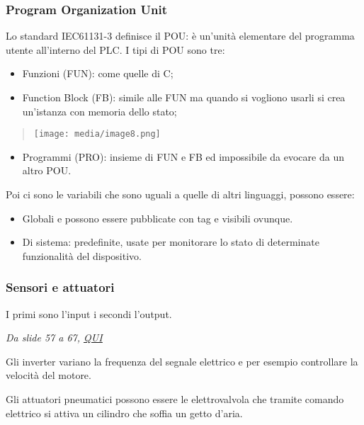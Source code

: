 \subsubsection{Program Organization
Unit}\label{program-organization-unit}

Lo standard IEC61131-3 definisce il POU: è un'unità elementare del
programma utente all'interno del PLC. I tipi di POU sono tre:

\begin{itemize}
\item
  Funzioni (FUN): come quelle di C;
\item
  Function Block (FB): simile alle FUN ma quando si vogliono usarli si
  crea un'istanza con memoria dello stato;
\end{itemize}

\begin{quote}
\texttt{[image: media/image8.png]}
\end{quote}

\begin{itemize}
\item
  Programmi (PRO): insieme di FUN e FB ed impossibile da evocare da un
  altro POU.
\end{itemize}

Poi ci sono le variabili che sono uguali a quelle di altri linguaggi,
possono essere:

\begin{itemize}
\item
  Globali e possono essere pubblicate con tag e visibili ovunque.
\item
  Di sistema: predefinite, usate per monitorare lo stato di determinate
  funzionalità del dispositivo.
\end{itemize}

\subsubsection{Sensori e attuatori}\label{sensori-e-attuatori}

I primi sono l'input i secondi l'output.

\emph{Da slide 57 a 67,
\href{https://virtuale.unibo.it/pluginfile.php/2061612/mod_resource/content/0/LabSisReti\%20-\%20Modulo\%20I\%20-\%20Parte\%20I.pdf}{\ul{QUI}}}

Gli inverter variano la frequenza del segnale elettrico e per esempio
controllare la velocità del motore.

Gli attuatori pneumatici possono essere le elettrovalvola che tramite
comando elettrico si attiva un cilindro che soffia un getto d'aria.

